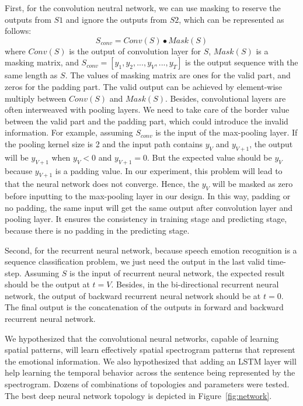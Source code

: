 \documentclass[a4paper]{article}
\begin{document}
First, for the convolution neutral network, we can use masking to reserve the outputs from $S1$ and ignore the outputs from $S2$, which can be represented as follows:
\begin{equation}
\label{eq:masking}
S_{conv}=Conv(S) \bullet Mask(S)
\end{equation}
where $Conv(S)$ is the output of convolution layer for $S$, $Mask(S)$ is a masking matrix, and $S_{conv}=[y_1, y_2, ..., y_V, ..., y_T]$ is the output sequence with the same length as $S$. The values of masking matrix are ones for the valid part, and zeros for the padding part. The valid output can be achieved by element-wise multiply between $Conv(S)$ and $Mask(S)$. Besides, convolutional layers are often interweaved with pooling layers. We need to take care of the border value between the valid part and the padding part, which could introduce the invalid information. For example, assuming $S_{conv}$ is the input of the max-pooling layer. If the pooling kernel size is 2 and the input path contains $y_V$ and $y_{V+1}$, the output will be $y_{V+1}$ when $y_V<0$ and $y_{V+1}=0$. But the expected value should be $y_V$ because $y_{V+1}$ is a padding value. In our experiment, this problem will lead to that the neural network does not converge. Hence, the $y_V$ will be masked as zero before inputting to the max-pooling layer in our design. In this way, padding or no padding, the same input will get the same output after convolution layer and pooling layer. It ensures the consistency in training stage and predicting stage, because there is no padding in the predicting stage.

Second, for the recurrent neural network, because speech emotion recognition is a sequence classification problem, we just need the output in the last valid time-step. Assuming $S$ is the input of recurrent neural network, the expected result should be the output at $t=V$. Besides, in the bi-directional recurrent neural network, the output of backward recurrent neural network should be at $t=0$. The final output is the concatenation of the outputs in forward and backward recurrent neural network.

We hypothesized that the convolutional neural networks, capable of learning spatial patterns, will learn effectively spatial spectrogram patterns that represent the emotional information. We also hypothesized that adding an LSTM layer will help learning the temporal behavior across the sentence being represented by the spectrogram. Dozens of combinations of topologies and parameters were tested. The best deep neural network topology is depicted in Figure~\ref{fig:network}.
\end{document}
